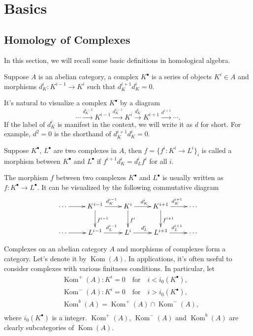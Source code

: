 \chapter{Basics}

\section{Homology of Complexes}

In this section, we will recall some basic definitions in
homological algebra.

\begin{definition}
	Suppose $A$ is an abelian category, a complex $K^\bullet$
	is a series of objects $K^i\in A$ and morphisms $d^i_K:K^{i-1}\to K^i$ such that $d_K^{i+1}d_K^i=0$.
\end{definition}

It's natural to visualize a complex $K^\bullet$ by a diagram
\[
	\cdots  \xrightarrow{d_K^{i-2}} K^{i-1} \xrightarrow{d_K^{i-1}}K^i \xrightarrow{d_K^{i}}
	K^{i+1}\xrightarrow{d^{i+1}}\cdots.
\]
If the label of $d_K^{i}$ is manifest in the context, 
we will write it as $d$ for short. For example, $d^2=0$ is the 
shorthand of $d_K^{i+1}d_K^i=0$.

\begin{definition}
	Suppose $K^\bullet$, $L^\bullet$ are two complexes in $A$, then
	$f=\{f^i:K^i\to L^i\}_i$ is called a morphism between 
	$K^\bullet$ and $L^\bullet$ if $f^{i+1}d^i_K=d^i_Lf^i$ for all $i$.
\end{definition}

The morphism $f$ between two complexes $K^\bullet$ and $L^\bullet$  
is usually written as $f:K^\bullet\to L^\bullet$.
It can be visualized by the following commutative diagram
\[
	\xymatrix{
		\cdots \ar[r]& K^{i-1}\ar[r]^{d^{i-1}_K}\ar[d]^{f^{i-1}}&K^i\ar[r]^{d^{i}_K}\ar[d]^{f^{i}}&K^{i+1}\ar[r]^{d^{i+1}_K}\ar[d]^{f^{i+1}}&\cdots\\
		\cdots \ar[r]& L^{i-1}\ar[r]^{d^{i-1}_L}&L^i\ar[r]^{d^{i}_L}&L^{i+1}\ar[r]^{d^{i+1}_L}&\cdots
	}
\]

Complexes on an abelian category $A$ 
and morphisms of complexes form a category. Let's denote it by 
$\operatorname{Kom}(A)$. In applications, it's often useful to consider
complexes with various finitness conditions. In particular, let 
\[
\begin{aligned}
	&\operatorname{Kom}^+(A):K^i=0\quad \text{for}\quad i< i_0(K^\bullet),\\
	&\operatorname{Kom}^-(A):K^i=0\quad \text{for}\quad i> i_0(K^\bullet),\\
	&\operatorname{Kom}^b(A)=\operatorname{Kom}^+(A)\cap \operatorname{Kom}^-(A),\\
\end{aligned}
\]
where $i_0(K^\bullet)$ is a integer. $\operatorname{Kom}^+(A)$, 
$\operatorname{Kom}^-(A)$ and $\operatorname{Kom}^b(A)$ are clearly
subcategories of $\operatorname{Kom}(A)$.

